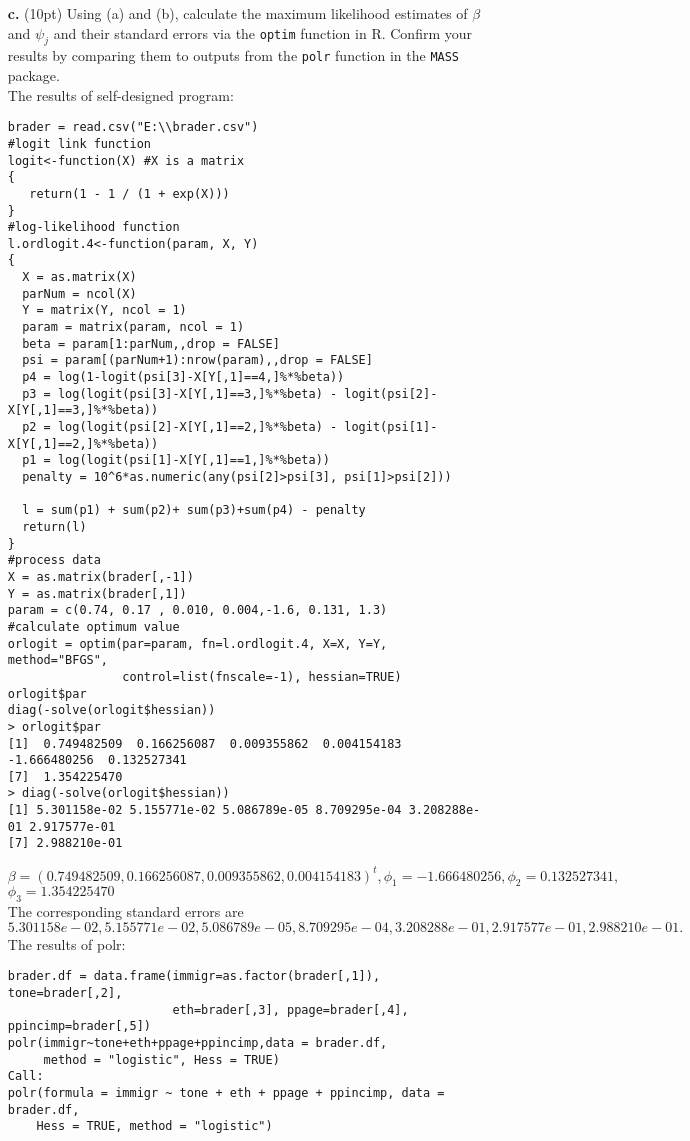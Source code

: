 \documentclass[11pt,english]{article}
\begin{document}
\begin{itemize}
\item[{\bf c.}] (10pt) Using (a) and (b), calculate the maximum likelihood estimates of $\beta$ and $\psi_j$ and their standard errors via the {\tt optim} function in R. Confirm your results by comparing them to outputs from the {\tt polr} function in the {\tt MASS} package.\\
The results of self-designed program:
\begin{verbatim}
brader = read.csv("E:\\brader.csv")
#logit link function
logit<-function(X) #X is a matrix
{
   return(1 - 1 / (1 + exp(X)))
}
#log-likelihood function
l.ordlogit.4<-function(param, X, Y)
{
  X = as.matrix(X)
  parNum = ncol(X)
  Y = matrix(Y, ncol = 1)
  param = matrix(param, ncol = 1)
  beta = param[1:parNum,,drop = FALSE]
  psi = param[(parNum+1):nrow(param),,drop = FALSE]
  p4 = log(1-logit(psi[3]-X[Y[,1]==4,]%*%beta))
  p3 = log(logit(psi[3]-X[Y[,1]==3,]%*%beta) - logit(psi[2]-X[Y[,1]==3,]%*%beta))
  p2 = log(logit(psi[2]-X[Y[,1]==2,]%*%beta) - logit(psi[1]-X[Y[,1]==2,]%*%beta))
  p1 = log(logit(psi[1]-X[Y[,1]==1,]%*%beta))
  penalty = 10^6*as.numeric(any(psi[2]>psi[3], psi[1]>psi[2]))

  l = sum(p1) + sum(p2)+ sum(p3)+sum(p4) - penalty
  return(l)
}
#process data
X = as.matrix(brader[,-1])
Y = as.matrix(brader[,1])
param = c(0.74, 0.17 , 0.010, 0.004,-1.6, 0.131, 1.3)
#calculate optimum value
orlogit = optim(par=param, fn=l.ordlogit.4, X=X, Y=Y, method="BFGS",
                control=list(fnscale=-1), hessian=TRUE)
orlogit$par
diag(-solve(orlogit$hessian))
> orlogit$par
[1]  0.749482509  0.166256087  0.009355862  0.004154183 -1.666480256  0.132527341
[7]  1.354225470
> diag(-solve(orlogit$hessian))
[1] 5.301158e-02 5.155771e-02 5.086789e-05 8.709295e-04 3.208288e-01 2.917577e-01
[7] 2.988210e-01
\end{verbatim}
$\beta = (0.749482509,  0.166256087,  0.009355862,  0.004154183)^t, \phi_1 =  -1.666480256, \phi_2= 0.132527341,$ $\phi_3= 1.354225470$\\
The corresponding standard errors are $5.301158e-02, 5.155771e-02, 5.086789e-05, 8.709295e-04, 3.208288e-01, 2.917577e-01, 2.988210e-01.$\\
The results of polr:
\begin{verbatim}
brader.df = data.frame(immigr=as.factor(brader[,1]), tone=brader[,2],
                       eth=brader[,3], ppage=brader[,4], ppincimp=brader[,5])
polr(immigr~tone+eth+ppage+ppincimp,data = brader.df,
     method = "logistic", Hess = TRUE)
Call:
polr(formula = immigr ~ tone + eth + ppage + ppincimp, data = brader.df,
    Hess = TRUE, method = "logistic")


\end{verbatim}
\end{itemize}
\end{document}
